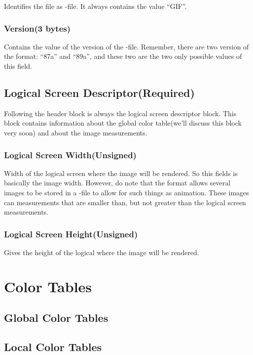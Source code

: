 \begin{refsection}
  Identifies the file as \gif-file. It always contains the
  value ``GIF''.

  \subsubsection{Version(3 bytes)}

  Contains the value of the version of the \gif-file. Remember, there
  are two version of the \gif format: ``87a'' and ``89a'', and these
  two are the two only possible values of this field.

  \subsection{Logical Screen Descriptor(Required)}

  Following the header block is always the logical screen descriptor
  block. This block contains information about the global color
  table(we'll discuss this block very soon) and about the image
  measurements.

  \subsubsection{Logical Screen Width(Unsigned)}

  Width of the logical screen where the image will be rendered. So
  this fields is basically the image width. However, do note that the
  \gif format allows several images to be stored in a \gif-file to
  allow for such things as animation. These images can measurements
  that are smaller than, but not greater than the logical screen
  measurements.

  \subsubsection{Logical Screen Height(Unsigned)}

  Gives the height of the logical where the image will be rendered.

  \section{Color Tables}

  \subsection{Global Color Tables}

  \subsection{Local Color Tables}


\end{refsection}
